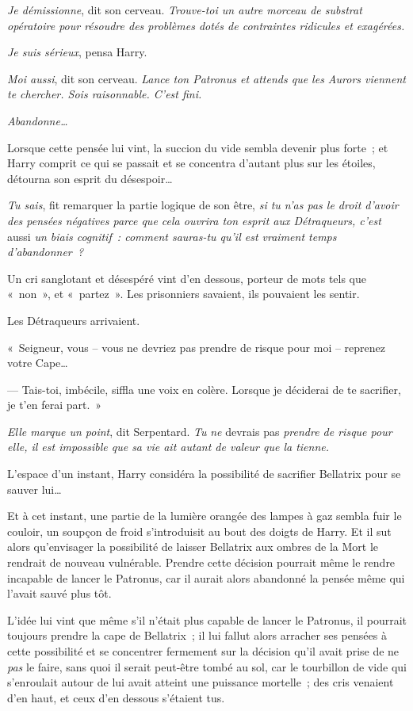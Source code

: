 \emph{Je démissionne}, dit son cerveau.
\emph{Trouve-toi un autre morceau de substrat opératoire pour résoudre des problèmes dotés de contraintes ridicules et exagérées.}

\emph{Je suis sérieux}, pensa Harry.

\emph{Moi aussi}, dit son cerveau.
\emph{Lance ton Patronus et attends que les Aurors viennent te chercher.
Sois raisonnable.
C'est fini.}

\emph{Abandonne…}

Lorsque cette pensée lui vint, la succion du vide sembla devenir plus forte~; et Harry comprit ce qui se passait et se concentra d'autant plus sur les étoiles, détourna son esprit du désespoir…

\emph{Tu sais}, fit remarquer la partie logique de son être, \emph{si tu n'as pas le droit d'avoir des pensées négatives parce que cela ouvrira ton esprit aux Détraqueurs, c'est} aussi \emph{un biais cognitif~: comment sauras-tu qu'il est vraiment temps d'abandonner~?}

Un cri sanglotant et désespéré vint d'en dessous, porteur de mots tels que «~non~», et «~partez~».
Les prisonniers savaient, ils pouvaient les sentir.

Les Détraqueurs arrivaient.

«~Seigneur, vous -- vous ne devriez pas prendre de risque pour moi -- reprenez votre Cape…

--- Tais-toi, imbécile, siffla une voix en colère.
Lorsque je déciderai de te sacrifier, je t'en ferai part.~»

\emph{Elle marque un point}, dit Serpentard.
\emph{Tu} \emph{ne} devrais pas \emph{prendre de risque pour elle, il est impossible que sa vie ait autant de valeur que la tienne.}

L'espace d'un instant, Harry considéra la possibilité de sacrifier Bellatrix pour se sauver lui…

Et à cet instant, une partie de la lumière orangée des lampes à gaz sembla fuir le couloir, un soupçon de froid s'introduisit au bout des doigts de Harry.
Et il sut alors qu'envisager la possibilité de laisser Bellatrix aux ombres de la Mort le rendrait de nouveau vulnérable.
Prendre cette décision pourrait même le rendre incapable de lancer le Patronus, car il aurait alors abandonné la pensée même qui l'avait sauvé plus tôt.

L'idée lui vint que même s'il n'était plus capable de lancer le Patronus, il pourrait toujours prendre la cape de Bellatrix~; il lui fallut alors arracher ses pensées à cette possibilité et se concentrer fermement sur la décision qu'il avait prise de ne \emph{pas} le faire, sans quoi il serait peut-être tombé au sol, car le tourbillon de vide qui s'enroulait autour de lui avait atteint une puissance mortelle~; des cris venaient d'en haut, et ceux d'en dessous s'étaient tus.

